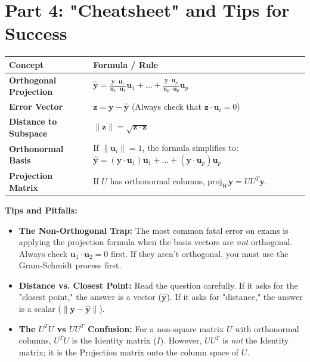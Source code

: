 \documentclass[11pt, letterpaper]{article}
\theoremstyle{definition}
\theoremstyle{remark}
\begin{document}
\newpage
\section{Part 4: "Cheatsheet" and Tips for Success}

\renewcommand{\arraystretch}{1.5}
\begin{tabularx}{\textwidth}{>{\raggedright\arraybackslash}p{4cm} X}
\toprule
\textbf{Concept} & \textbf{Formula / Rule} \\
\midrule
\textbf{Orthogonal Projection} & $\displaystyle \hat{\mathbf{y}} = \frac{\mathbf{y} \cdot \mathbf{u}_1}{\mathbf{u}_1 \cdot \mathbf{u}_1}\mathbf{u}_1 + \dots + \frac{\mathbf{y} \cdot \mathbf{u}_p}{\mathbf{u}_p \cdot \mathbf{u}_p}\mathbf{u}_p$ \\
\addlinespace[4pt]
\textbf{Error Vector} & $\displaystyle \mathbf{z} = \mathbf{y} - \hat{\mathbf{y}}$ \quad (Always check that $\mathbf{z} \cdot \mathbf{u}_i = 0$) \\
\addlinespace[4pt]
\textbf{Distance to Subspace} & $\displaystyle \|\mathbf{z}\| = \sqrt{\mathbf{z} \cdot \mathbf{z}}$ \\
\addlinespace[4pt]
\textbf{Orthonormal Basis} & If $\|\mathbf{u}_i\| = 1$, the formula simplifies to: $\displaystyle \hat{\mathbf{y}} = (\mathbf{y} \cdot \mathbf{u}_1)\mathbf{u}_1 + \dots + (\mathbf{y} \cdot \mathbf{u}_p)\mathbf{u}_p$ \\
\addlinespace[4pt]
\textbf{Projection Matrix} & If $U$ has orthonormal columns, $\text{proj}_W \mathbf{y} = U U^T \mathbf{y}$. \\
\bottomrule
\end{tabularx}

\vspace{1em}
\textbf{Tips and Pitfalls:}
\begin{itemize}
    \item \textbf{The Non-Orthogonal Trap:} The most common fatal error on exams is applying the projection formula when the basis vectors are \textit{not} orthogonal. Always check $\mathbf{u}_1 \cdot \mathbf{u}_2 = 0$ first. If they aren't orthogonal, you must use the Gram-Schmidt process first.
    \item \textbf{Distance vs. Closest Point:} Read the question carefully. If it asks for the "closest point," the answer is a vector ($\hat{\mathbf{y}}$). If it asks for "distance," the answer is a scalar ($\|\mathbf{y} - \hat{\mathbf{y}}\|$).
    \item \textbf{The $U^T U$ vs $U U^T$ Confusion:} For a non-square matrix $U$ with orthonormal columns, $U^T U$ is the Identity matrix ($I$). However, $U U^T$ is \textit{not} the Identity matrix; it is the Projection matrix onto the column space of $U$.
\end{itemize}
\end{document}
